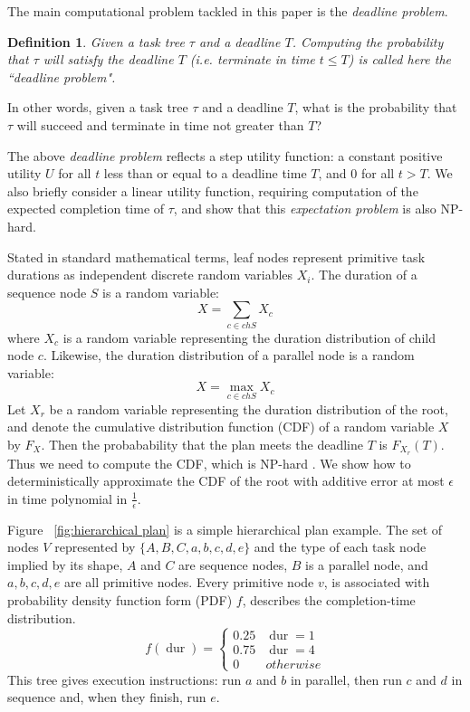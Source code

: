 \documentclass{article}
\newtheorem{definition}{Definition}
\DeclareMathOperator{\dur}{dur}
\begin{document}
The main computational problem tackled in this paper is the {\em deadline problem}. 
\begin{definition}\label{Def:Deadline}
	Given a task tree $\tau $ and a deadline $T$. 
	Computing the probability that $\tau $ will satisfy the deadline $T$ 
(i.e. terminate in time $t \leq T$) is called here the ``deadline problem".
\end{definition}
In other words, given a task tree $\tau $ and a deadline $T$, what is the probability that $\tau $ 
will succeed and terminate in time not greater than $T$? 

The above {\em deadline problem} reflects a step utility function: a 
constant positive utility $U$ for all $t$ less than or equal to a deadline 
time $T$, and $0$ for all $t>T$. We also briefly consider a linear utility function, requiring
computation of the expected completion time of $\tau$, and show that this {\em expectation problem} 
is also NP-hard.

Stated in standard mathematical terms, leaf nodes represent primitive task durations as
independent discrete random variables $X_i$. The duration of a sequence node $S$ is a random
variable:
\[
X = \sum_{c\in ch{S}} X_c
\]
where $X_c$ is a random variable representing the duration distribution of child node $c$.
Likewise, the duration distribution of a parallel node is a random variable:
\[
X = \max_{c\in ch{S}} X_c
\]
Let $X_r$ be a random variable representing the duration distribution of the root,
and denote the cumulative distribution function (CDF) of a random variable $X$ by $F_X$. Then
the probabability that the plan meets the deadline $T$ is $F_{X_r}(T)$.
Thus we need to compute the CDF, which is NP-hard \cite{}. We show how
to deterministically approximate the CDF of the root with additive error at most $\epsilon $
in time polynomial in $\frac{1}{\epsilon}$.

Figure ~\ref{fig:hierarchical plan} is a simple hierarchical plan example. The set of nodes $ V$ represented by $\lbrace A,B,C,a,b,c,d,e \rbrace $ and the type of each task node implied by its shape, $A$ and $C$ are sequence nodes, $ B $ is a parallel node, and $ a, b, c, d, e $ are all primitive nodes. Every primitive node $v$, is  associated with probability density function form (PDF) $f$, describes the completion-time distribution.
$$f(\dur)=
\begin{cases}
0.25 & \dur=1 \\
0.75 & \dur=4 \\
0 & otherwise
\end{cases}$$
This tree gives execution instructions: run $a$ and $b$ in parallel, then run $c$ and $d$ in sequence and, when they finish, run $e$.
\end{document}
